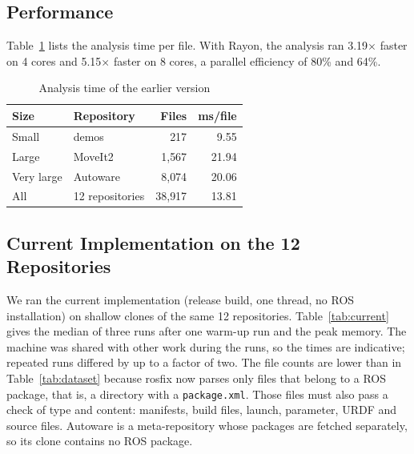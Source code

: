 \documentclass[conference]{IEEEtran}
\newcommand{\code}[1]{\texttt{#1}}
\begin{document}
\subsection{Performance}
\label{sec:perf}

Table~\ref{tab:scal} lists the analysis time per file. With Rayon, the analysis ran
3.19$\times$ faster on 4 cores and 5.15$\times$ faster on 8 cores, a parallel efficiency of 80\%
and 64\%.

\begin{table}[t]
\centering
\caption{Analysis time of the earlier version}
\label{tab:scal}
\footnotesize
\begin{tabular}{@{}llrr@{}}
\toprule
Size & Repository & Files & ms/file\\
\midrule
Small      & demos            &    217 &  9.55\\
Large      & MoveIt2          &  1{,}567 & 21.94\\
Very large & Autoware         &  8{,}074 & 20.06\\
\midrule
All        & 12 repositories  & 38{,}917 & 13.81\\
\bottomrule
\end{tabular}
\end{table}

\subsection{Current Implementation on the 12 Repositories}
\label{sec:current}

We ran the current implementation (release build, one thread, no ROS installation) on shallow
clones of the same 12 repositories. Table~\ref{tab:current} gives the median of three runs after
one warm-up run and the peak memory. The machine was shared with other work during the runs, so
the times are indicative; repeated runs differed by up to a factor of two. The file counts are
lower than in Table~\ref{tab:dataset} because rosfix now parses only files that belong to a ROS
package, that is, a directory with a \code{package.xml}. Those files must also pass a check of
type and content: manifests, build files, launch, parameter, URDF and source files. Autoware is a
meta-repository whose packages are fetched separately, so its clone contains no ROS package.
\end{document}
